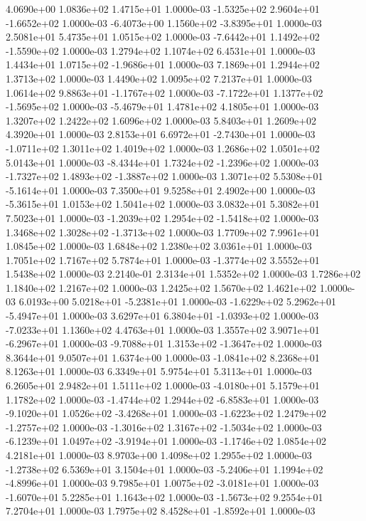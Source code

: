 4.0690e+00 1.0836e+02 1.4715e+01  1.0000e-03
-1.5325e+02  2.9604e+01 -1.6652e+02  1.0000e-03
-6.4073e+00  1.1560e+02 -3.8395e+01  1.0000e-03
2.5081e+01 5.4735e+01 1.0515e+02  1.0000e-03
-7.6442e+01  1.1492e+02 -1.5590e+02  1.0000e-03
1.2794e+02 1.1074e+02 6.4531e+01  1.0000e-03
 1.4434e+01  1.0715e+02 -1.9686e+01  1.0000e-03
7.1869e+01 1.2944e+02 1.3713e+02  1.0000e-03
1.4490e+02 1.0095e+02 7.2137e+01  1.0000e-03
 1.0614e+02  9.8863e+01 -1.1767e+02  1.0000e-03
-7.1722e+01  1.1377e+02 -1.5695e+02  1.0000e-03
-5.4679e+01  1.4781e+02  4.1805e+01  1.0000e-03
1.3207e+02 1.2422e+02 1.6096e+02  1.0000e-03
5.8403e+01 1.2609e+02 4.3920e+01  1.0000e-03
 2.8153e+01  6.6972e+01 -2.7430e+01  1.0000e-03
-1.0711e+02  1.3011e+02  1.4019e+02  1.0000e-03
1.2686e+02 1.0501e+02 5.0143e+01  1.0000e-03
-8.4344e+01  1.7324e+02 -1.2396e+02  1.0000e-03
-1.7327e+02  1.4893e+02 -1.3887e+02  1.0000e-03
 1.3071e+02  5.5308e+01 -5.1614e+01  1.0000e-03
7.3500e+01 9.5258e+01 2.4902e+00  1.0000e-03
-5.3615e+01  1.0153e+02  1.5041e+02  1.0000e-03
3.0832e+01 5.3082e+01 7.5023e+01  1.0000e-03
-1.2039e+02  1.2954e+02 -1.5418e+02  1.0000e-03
 1.3468e+02  1.3028e+02 -1.3713e+02  1.0000e-03
1.7709e+02 7.9961e+01 1.0845e+02  1.0000e-03
1.6848e+02 1.2380e+02 3.0361e+01  1.0000e-03
1.7051e+02 1.7167e+02 5.7874e+01  1.0000e-03
-1.3774e+02  3.5552e+01  1.5438e+02  1.0000e-03
2.2140e-01 2.3134e+01 1.5352e+02  1.0000e-03
1.7286e+02 1.1840e+02 1.2167e+02  1.0000e-03
1.2425e+02 1.5670e+02 1.4621e+02  1.0000e-03
 6.0193e+00  5.0218e+01 -5.2381e+01  1.0000e-03
-1.6229e+02  5.2962e+01 -5.4947e+01  1.0000e-03
 3.6297e+01  6.3804e+01 -1.0393e+02  1.0000e-03
-7.0233e+01  1.1360e+02  4.4763e+01  1.0000e-03
 1.3557e+02  3.9071e+01 -6.2967e+01  1.0000e-03
-9.7088e+01  1.3153e+02 -1.3647e+02  1.0000e-03
8.3644e+01 9.0507e+01 1.6374e+00  1.0000e-03
-1.0841e+02  8.2368e+01  8.1263e+01  1.0000e-03
6.3349e+01 5.9754e+01 5.3113e+01  1.0000e-03
6.2605e+01 2.9482e+01 1.5111e+02  1.0000e-03
-4.0180e+01  5.1579e+01  1.1782e+02  1.0000e-03
-1.4744e+02  1.2944e+02 -6.8583e+01  1.0000e-03
-9.1020e+01  1.0526e+02 -3.4268e+01  1.0000e-03
-1.6223e+02  1.2479e+02 -1.2757e+02  1.0000e-03
-1.3016e+02  1.3167e+02 -1.5034e+02  1.0000e-03
-6.1239e+01  1.0497e+02 -3.9194e+01  1.0000e-03
-1.1746e+02  1.0854e+02  4.2181e+01  1.0000e-03
8.9703e+00 1.4098e+02 1.2955e+02  1.0000e-03
-1.2738e+02  6.5369e+01  3.1504e+01  1.0000e-03
-5.2406e+01  1.1994e+02 -4.8996e+01  1.0000e-03
 9.7985e+01  1.0075e+02 -3.0181e+01  1.0000e-03
-1.6070e+01  5.2285e+01  1.1643e+02  1.0000e-03
-1.5673e+02  9.2554e+01  7.2704e+01  1.0000e-03
 1.7975e+02  8.4528e+01 -1.8592e+01  1.0000e-03
